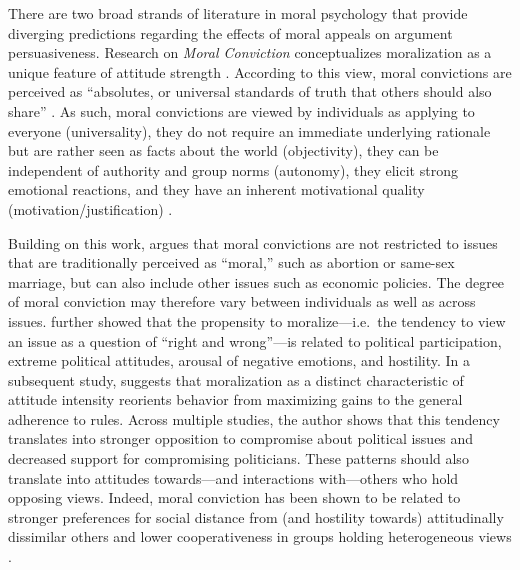 There are two broad strands of literature in moral psychology that provide diverging predictions regarding the effects of moral appeals on argument persuasiveness. Research on \textit{Moral Conviction} conceptualizes moralization as a unique feature of attitude strength \citep{skitka2005moral}. According to this view, moral convictions are perceived as ``absolutes, or universal standards of truth that others should also share'' \citep[269]{skitka2010psychology}. As such, moral convictions are viewed by individuals as applying to everyone (universality), they do not require an immediate underlying rationale but are rather seen as facts about the world (objectivity), they can be independent of authority and group norms (autonomy), they elicit strong emotional reactions, and they have an inherent motivational quality (motivation/justification) \citep{skitka2010psychology}.

Building on this work, \citet{ryan2014reconsidering} argues that moral convictions are not restricted to issues that are traditionally perceived as ``moral,'' such as abortion or same-sex marriage, but can also include other issues such as economic policies. The degree of moral conviction may therefore vary between individuals as well as across issues. \citet{ryan2014reconsidering} further showed that the propensity to moralize---i.e.~the tendency to view an issue as a question of ``right and wrong''---is related to political participation, extreme political attitudes, arousal of negative emotions, and hostility. In a subsequent study, \citet{ryan2017no} suggests that moralization as a distinct characteristic of attitude intensity reorients behavior from maximizing gains to the general adherence to rules. Across multiple studies, the author shows that this tendency translates into stronger opposition to compromise about political issues and decreased support for compromising politicians. These patterns should also translate into attitudes towards---and interactions with---others who hold opposing views. Indeed, moral conviction has been shown to be related to stronger preferences for social distance from (and hostility towards) attitudinally dissimilar others and lower cooperativeness in groups holding heterogeneous views \citep{skitka2005moral}.

